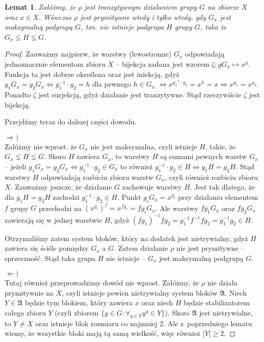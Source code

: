 \documentclass[licencjacka]{pracamgr}
\newtheorem{lemma}{Lemat}[section]
\begin{document}
\begin{lemma}\label{max_group}
    Załóżmy, że $\rho$ jest tranzytywnym działaniem grupy $G$ na zbiorze $X$ oraz $x \in X$.
    Wówczas $\rho$ jest prymitywne wtedy i tylko wtedy, gdy $G_x$ jest maksymalną podgrupą $G$, tzn.
    nie istnieje podgrupa $H$ grupy $G$, taka że $G_x \lneq H \lneq G$.
\end{lemma}
\begin{proof}
Zauważmy najpierw, że warstwy (lewostronne) $G_x$ odpowiadają
jednoznacznie elementom zbioru $X$ -- bijekcja zadana jest wzorem
$\zeta \colon g G_x \mapsto x^g$. Funkcja ta jest dobrze określona
oraz jest iniekcją, gdyż $g_1 G_x = g_2 G_x \iff g_1^{-1} \cdot g_2
= h$ dla pewnego $h \in G_x$ $\iff x^{g_1^{-1} \cdot g_2} = x^h = x
\iff x^{g_1} = x^{g_2}$. Ponadto $\zeta$ jest surjekcją, gdyż
działanie jest tranzytywne. Stąd rzeczywiście $\zeta$ jest bijekcją.

Przejdźmy teraz do dalszej części dowodu.

$\Rightarrow)$ \\
Załóżmy nie wprost, że $G_x$ nie jest maksymalna, czyli istnieje
$H$, takie, że $G_x \lneq H \lneq G$. Skoro $H$ zawiera $G_x$, to
warstwy $H$ są sumami pewnych warstw $G_x$ -- jeżeli $g_1 G_x = g_2
G_x \iff g_1^{-1} \cdot g_2 \in G_x$ to również $g_1^{-1} \cdot g_2
\in H \iff g_1 H = g_2 H$. Stąd warstwy $H$ odpowiadają rozbiciu
zbioru warstw $G_x$, czyli również rozbiciu zbioru $X$. Zauważmy
jeszcze, że działanie $G$ zachowuje warstwy $H$. Jest tak dlatego,
że dla $g_1 H = g_2 H$ zachodzi $g_1^{-1} \cdot g_2 \in H$. Punkt
$g_i G_x = x^{g_i}$ przy działaniu elementem $f$ grupy $G$
przechodzi na $(x^{g_i})^f = x^{f g_i} = f g_i G_x$. Ale warstwy $f
g_1 G_x$ oraz $f g_2 G_x$ zawierają się w jednej warstwie $H$, gdyż
$(f g_1)^{-1} f g_2 = g_1^{-1} f^{-1} f g_2 = g_1^{-1} g_2 \in H$.

Otrzymaliśmy zatem system bloków, który na dodatek jest
nietrywialny, gdyż $H$ zawiera się ściśle pomiędzy $G_x$ a $G$.
Zatem działanie $\rho$ nie jest prymitywne -- sprzeczność. Stąd taka
grupa $H$ nie istnieje -- $G_x$ jest maksymalną podgrupą $G$.

$\Leftarrow)$ \\
Tutaj również przeprowadzimy dowód nie wprost. Załóżmy, że $\rho$
nie działa prymitywnie na $X$, czyli istnieje pewien nietrywialny
system bloków $\mathfrak{A}$. Niech $Y \in \mathfrak{A}$ będzie tym blokiem, który
zawiera $x$ oraz niech $H$ będzie stabilizatorem całego zbioru $Y$
(czyli zbiorem $\{g \in G \colon \forall_{y \in Y} y^g \in Y \}$).
Skoro $\mathfrak{A}$ jest nietrywialne, to $Y \ne X$ oraz istnieje
blok rozmiaru co najmniej 2. Ale z~poprzedniego lematu wiemy, że
wszystkie bloki mają tą samą wielkość, więc również $|Y| \ge 2$.


\end{proof}
\end{document}
